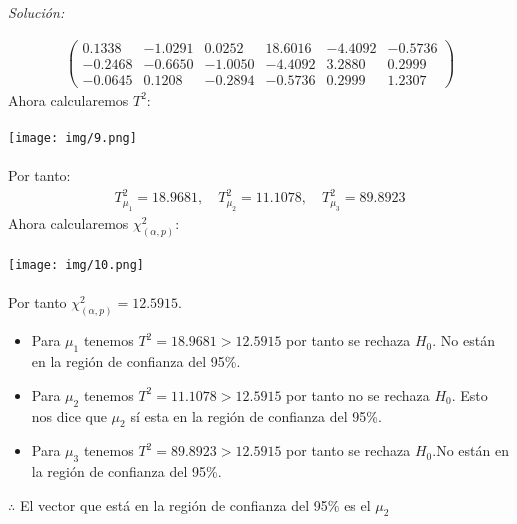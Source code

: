 \documentclass[12pt]{article}
\newenvironment{sol}
    {\emph{Solución:}
    }
    {
    }
\begin{document}
\begin{sol}
\begin{itemize}
\begin{align*}
\begin{pmatrix}
  0.1338 & -1.0291 &  0.0252 & 18.6016 & -4.4092 & -0.5736 \\
 -0.2468 & -0.6650 & -1.0050 & -4.4092 &  3.2880 &  0.2999 \\
 -0.0645 &  0.1208 & -0.2894 & -0.5736 &  0.2999 &  1.2307
\end{pmatrix}
\end{align*}
Ahora calcularemos $T^2$:\\\\
\texttt{[image: img/9.png]}\\\\
Por tanto:
\begin{align*}
T_{\mu_1}^2=18.9681,\quad T_{\mu_2}^2=11.1078,\quad T_{\mu_3}^2=89.8923
\end{align*}
Ahora calcularemos $\chi_{(\alpha,p)}^2$:\\\\
\texttt{[image: img/10.png]}\\\\
Por tanto $\chi_{(\alpha,p)}^2=12.5915$.
\begin{itemize}
\item Para $\mu_1$ tenemos $T^2=18.9681 > 12.5915$ por tanto se rechaza $H_0$. No están en la región de confianza del 95\%.
\item Para $\mu_2$ tenemos $T^2=11.1078 > 12.5915$ por tanto no se rechaza $H_0$. Esto nos dice que $\mu_2$ sí esta en la región de confianza del 95\%.
\item Para $\mu_3$ tenemos $T^2=89.8923 > 12.5915$ por tanto se rechaza $H_0$.No están en la región de confianza del 95\%.
\end{itemize}
$\therefore$ El vector que está en la región de confianza del 95\% es el $\mu_2$ \pagebreak


\end{itemize}
\end{sol}
\end{document}
